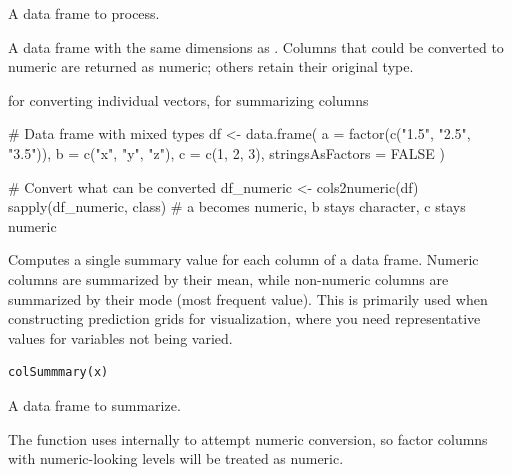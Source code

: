 \documentclass[a4paper]{book}
\begin{document}
%
\begin{Arguments}
\begin{ldescription}
\item[\code{x}] A data frame to process.
\end{ldescription}
\end{Arguments}
%
\begin{Value}
A data frame with the same dimensions as . Columns that
could be converted to numeric are returned as numeric; others retain
their original type.
\end{Value}
%
\begin{SeeAlso}
 for converting individual vectors,
 for summarizing columns
\end{SeeAlso}
%
\begin{Examples}
\begin{ExampleCode}
# Data frame with mixed types
df <- data.frame(
  a = factor(c("1.5", "2.5", "3.5")),
  b = c("x", "y", "z"),
  c = c(1, 2, 3),
  stringsAsFactors = FALSE
)

# Convert what can be converted
df_numeric <- cols2numeric(df)
sapply(df_numeric, class)
# a becomes numeric, b stays character, c stays numeric

\end{ExampleCode}
\end{Examples}
%
\begin{Description}
Computes a single summary value for each column of a data frame. Numeric
columns are summarized by their mean, while non-numeric columns are
summarized by their mode (most frequent value). This is primarily used when
constructing prediction grids for visualization, where you need representative
values for variables not being varied.
\end{Description}
%
\begin{Usage}
\begin{verbatim}
colSummmary(x)
\end{verbatim}
\end{Usage}
%
\begin{Arguments}
\begin{ldescription}
\item[\code{x}] A data frame to summarize.
\end{ldescription}
\end{Arguments}
%
\begin{Details}
The function uses  internally to attempt numeric conversion,
so factor columns with numeric-looking levels will be treated as numeric.
\end{Details}
\end{document}
